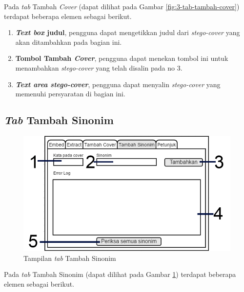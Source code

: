 Pada \textit{tab} Tambah \textit{Cover} (dapat dilihat pada Gambar \ref{fig:3-tab-tambah-cover}) terdapat beberapa elemen sebagai berikut.

\begin{enumerate}
	\item \textbf{\textit{Text box} judul}, pengguna dapat mengetikkan judul dari \textit{stego-cover} yang akan ditambahkan pada bagian ini.
	\item \textbf{Tombol Tambah \textit{Cover}}, pengguna dapat menekan tombol ini untuk menambahkan \textit{stego-cover} yang telah disalin pada no 3.
	\item \textbf{\textit{Text area stego-cover}}, pengguna dapat menyalin \textit{stego-cover} yang memenuhi persyaratan di bagian ini.	
\end{enumerate} 

\subsection{\textit{Tab} Tambah Sinonim}

\begin{figure}[H]
	\centering
	\includegraphics[scale=1.8]{Gambar/tab-tambah-sinonim}
	\caption{Tampilan \textit{tab} Tambah Sinonim} 
	\label{fig:4-tab-tambah-sinonim}
\end{figure}

Pada \textit{tab} Tambah Sinonim (dapat dilihat pada Gambar \ref{fig:4-tab-tambah-sinonim}) terdapat beberapa elemen sebagai berikut.

